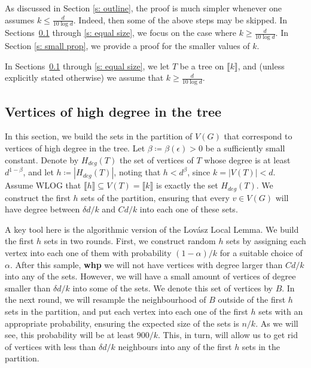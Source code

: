 \documentclass[notitlepage]{scrartcl}
\newcommand{\br}[1]{\llbracket{#1}\rrbracket}
\begin{document}
As discussed in Section \ref{s: outline}, the proof is much simpler whenever one assumes $k \le \frac{d}{10\log d}$. Indeed, then some of the above steps may be skipped. In Sections~\ref{s: high deg} through \ref{s: equal size}, we focus on the case where $k \ge \frac{d}{10 \log d}$. In Section \ref{s: small prop}, we provide a proof for the smaller values of $k$.

In Sections~\ref{s: high deg} through \ref{s: equal size}, we let $T$ be a tree on $\br{k}$, and (unless explicitly stated otherwise) we assume that $k\ge \frac{d}{10\log d}$. 

\subsection{Vertices of high degree in the tree}\label{s: high deg} 
In this section, we build the sets in the partition of $V(G)$ that correspond to vertices of high degree in the tree. Let $\beta\coloneqq \beta(\epsilon) > 0$ be a sufficiently small constant. Denote by $H_{deg}(T)$ the set of vertices of $T$ whose degree is at least $d^{1-\beta}$, and let $h\coloneqq |H_{deg}(T)|$, noting that $h < d^{\beta}$, since $k=|V(T)|<d$. Assume WLOG that $\br{h} \subseteq V(T) = \br{k}$ is exactly the set $H_{deg}(T)$. We construct the first $h$ sets of the partition, ensuring that every $v\in V(G)$ will have degree between $\delta d/k$ and $Cd/k$ into each one of these sets.

A key tool here is the algorithmic version of the Lov\'asz Local Lemma. We build the first $h$ sets in two rounds. First, we construct random $h$ sets by assigning each vertex into each one of them with probability $(1-\alpha)/k$ for a suitable choice of $\alpha$. After this sample, \textbf{whp} we will not have vertices with degree larger than $C d/k$ into any of the sets. However, we will have a small amount of vertices of degree smaller than $\delta d / k$ into some of the sets. We denote this set of vertices by $B$. In the next round, we will resample the neighbourhood of $B$ outside of the first $h$ sets in the partition, and put each vertex into each one of the first $h$ sets with an appropriate probability, ensuring the expected size of the sets is $n/k$. As we will see, this probability will be at least $900/k$. This, in turn, will allow us to get rid of vertices with less than $\delta d/k$ neighbours into any of the first $h$ sets in the partition.
\end{document}

